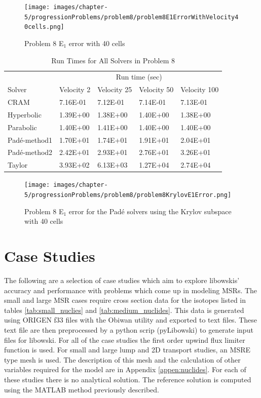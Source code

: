\clearpage

\begin{figure}[p]
    \centering
    \texttt{[image: images/chapter-5/progressionProblems/problem8/problem8E1ErrorWithVelocity40cells.png]}
    \caption{Problem 8 E${}_{1}$ error with 40 cells}
    \label{fig:problem8_E1_error_40cells}
\end{figure}

\clearpage

\begin{table}[p]
   \caption{\label{tab:problem8_run_times} Run Times for All Solvers in Problem 8}
   \centering
   \begin{tabular}{lllll}
   \hline
    \multicolumn{1}{c}{} & \multicolumn{4}{c}{Run time (sec)}  \\
    Solver & Velocity 2 & Velocity 25 & Velocity 50 & Velocity 100 \\
   \hline
	CRAM & 7.16E-01 & 7.12E-01	& 7.14E-01 & 7.13E-01 \\
	Hyperbolic & 1.39E+00 & 1.38E+00	& 1.40E+00 & 1.38E+00 \\
	Parabolic & 1.40E+00 & 1.41E+00	& 1.40E+00 & 1.40E+00 \\
	Pad\'e-method1 & 1.70E+01 & 1.74E+01	& 1.91E+01 & 2.04E+01 \\
	Pad\'e-method2 & 2.42E+01 & 2.93E+01	& 2.76E+01 & 3.26E+01 \\
	Taylor & 3.93E+02 & 6.13E+03	& 1.27E+04 & 2.74E+04 \\
   \hline
   \end{tabular}
\end{table}  

\clearpage

\begin{figure}[p]
    \centering
    \texttt{[image: images/chapter-5/progressionProblems/problem8/problem8KrylovE1Error.png]}
    \caption{Problem 8 E${}_{1}$ error for the Pad\'e solvers using the Krylov subspace with 40 cells}
    \label{fig:problem8_E1_error_krylov}
\end{figure}

\clearpage

\section{Case Studies}
The following are a selection of case studies which aim to explore libowskis' accuracy and performance with problems which come up in modeling MSRs. The small and large MSR cases require cross section data for the isotopes listed in tables \ref{tab:small_nuclies} and \ref{tab:medium_nuclides}. This data is generated using ORIGEN f33 files with the Obiwan utility and exported to text files. These text file are then preprocessed by a python scrip (pyLibowski) to generate input files for libowski. For all of the case studies the first order upwind flux limiter function is used. For small and large lump and 2D transport studies, an MSRE type mesh is used. The description of this mesh and the calculation of other variables required for the model are in Appendix \ref{appen:nuclides}. For each of these studies there is no analytical solution. The reference solution is computed using the MATLAB method previously described. 

